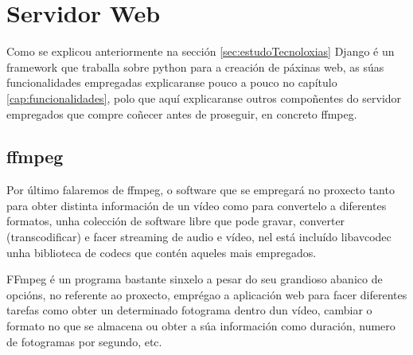 \section{Servidor Web}
    Como se explicou anteriormente na sección \ref{sec:estudoTecnoloxias} Django é un framework
    que traballa sobre python para a creación de páxinas web, as súas funcionalidades empregadas
    explicaranse pouco a pouco no capítulo \ref{cap:funcionalidades}, polo que aquí explicaranse
    outros compoñentes do servidor empregados que compre coñecer antes de proseguir, en concreto 
    ffmpeg.
    
\subsection{ffmpeg}
    Por último falaremos de ffmpeg, o software que se empregará no proxecto tanto para obter 
    distinta información de un vídeo como para convertelo a diferentes formatos, unha colección de 
    software libre que pode gravar, converter (transcodificar) e facer streaming de audio e vídeo,
    nel está incluído libavcodec unha biblioteca de codecs que contén aqueles mais empregados.
    
    FFmpeg é un programa bastante sinxelo a pesar do seu grandioso abanico de opcións, no referente
    ao proxecto, emprégao a aplicación web para facer diferentes tarefas como obter un determinado
    fotograma dentro dun vídeo, cambiar o formato no que se almacena ou obter a súa información como
    duración, numero de fotogramas por segundo, etc.
    